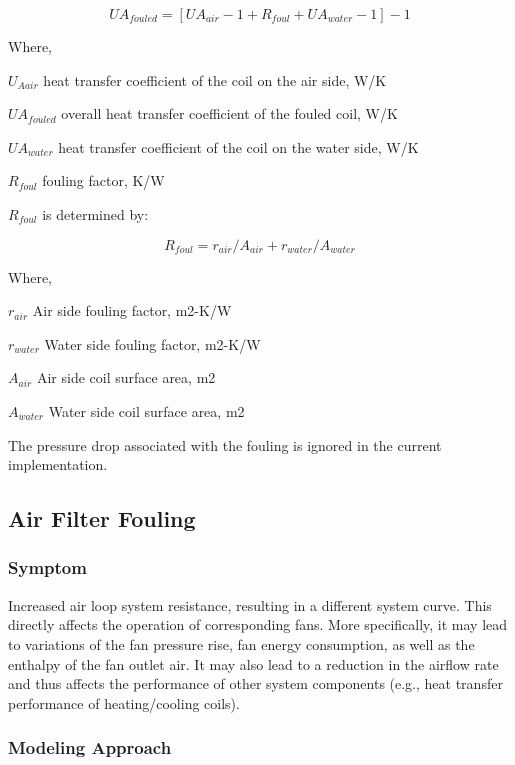 \begin{equation}
UA_{fouled} = [UA_{air} - 1  +  R_{foul}  + UA_{water} - 1]-1
\end{equation}

Where,

\(U_{Aair}\) heat transfer coefficient of the coil on the air side, W/K

\(UA_{fouled}\) overall heat transfer coefficient of the fouled coil, W/K

\(UA_{water}\) heat transfer coefficient of the coil on the water side, W/K

\(R_{foul}\) fouling factor, K/W

\(R_{foul}\) is determined by:

\begin{equation}
R_{foul} = r_{air}/A_{air} + r_{water} / A_{water}
\end{equation}

Where,

\(r_{air}\) Air side fouling factor, m2-K/W

\(r_{water}\) Water side fouling factor, m2-K/W

\(A_{air}\) Air side coil surface area, m2

\(A_{water}\) Water side coil surface area, m2

The pressure drop associated with the fouling is ignored in the current implementation.

\subsection{Air Filter Fouling}\label{air-filter-fouling}

\subsubsection{Symptom}\label{symptom-3}

Increased air loop system resistance, resulting in a different system curve. This directly affects the operation of corresponding fans. More specifically, it may lead to variations of the fan pressure rise, fan energy consumption, as well as the enthalpy of the fan outlet air. It may also lead to a reduction in the airflow rate and thus affects the performance of other system components (e.g., heat transfer performance of heating/cooling coils).

\subsubsection{Modeling Approach}\label{modeling-approach-3}

